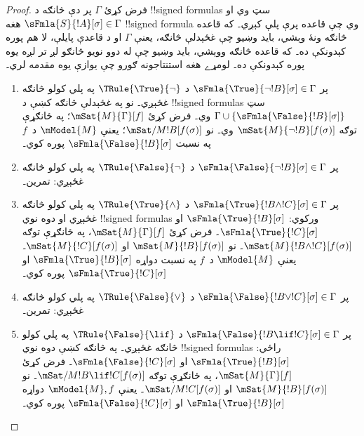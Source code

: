 \documentclass[../../../include/open-logic-section]{subfiles}
\begin{document}
\begin{proof}
فرض کړئ $\Gamma$ پر دې څانګه د !!{signed formula}s سټ وي او
$\sFmla{S}{!A}[\sigma] \in \Gamma$ هغه !!{signed formula}
وي چې قاعده پرې پلې کېږي۔ که قاعده څانګه ونۀ وېشي، بايد وښيو
چې غځېدلې څانګه، يعنې $\Gamma$ او د قاعدې پايلې، لا
هم پوره کېدونکې ده۔ که قاعده څانګه ووېشي، بايد وښيو چې له
دوو نويو څانګو لږ تر لږه يوه پوره کېدونکې ده۔
لومړے هغه استنتاجونه ګورو چې يوازې يوه مقدمه لري۔
\begin{enumerate}
\item پر $\sFmla{\True}{\lnot !B}[\sigma] \in \Gamma$ د
  $\TRule{\True}{\lnot}$ په پلي کولو څانګه غځېږي۔ نو په
  غځېدلې څانګه کښې د !!{signed formula}s سټ $\Gamma \cup
  \{\sFmla{\False}{!B}[\sigma]\}$ وي۔ فرض کړئ
  $\mSat{M}{\Gamma}[f]$؛ په ځانګړې توګه
  $\mSat{M}{\lnot !B}[f(\sigma)]$ وي۔ نو
  $\mSat/{M}{!B}[f(\sigma)]$؛ يعنې $\mModel{M}$ د~$f$ په
  نسبت $\sFmla{\False}{!B}[\sigma]$ پوره کوي۔
\item پر $\sFmla{\False}{\lnot !B}[\sigma] \in \Gamma$ د
  $\TRule{\False}{\lnot}$ په پلي کولو څانګه غځېږي: تمرين۔
\item پر $\sFmla{\True}{!B \land !C}[\sigma] \in \Gamma$ د
  $\TRule{\True}{\land}$ په پلي کولو څانګه غځېږي او دوه نوي
  !!{signed formula}s ورکوي:
  $\sFmla{\True}{!B}[\sigma]$ او $\sFmla{\True}{!C}[\sigma]$۔
  فرض کړئ $\mSat{M}{\Gamma}[f]$، په ځانګړې توګه
  $\mSat{M}{!B \land !C}[f(\sigma)]$۔ نو
  $\mSat{M}{!B}[f(\sigma)]$ او $\mSat{M}{!C}[f(\sigma)]$۔
  يعنې $\mModel{M}$ د~$f$ په نسبت دواړه
  $\sFmla{\True}{!B}[\sigma]$ او
  $\sFmla{\True}{!C}[\sigma]$ پوره کوي۔
\item پر $\sFmla{\False}{!B \lor !C}[\sigma] \in \Gamma$ د
  $\TRule{\False}{\lor}$ په پلي کولو څانګه غځېږي: تمرين۔
\item پر $\sFmla{\False}{!B \lif !C}[\sigma] \in \Gamma$ د
  $\TRule{\False}{\lif}$ په پلي کولو څانګه غځېږي۔ په څانګه
  کښې دوه نوي !!{signed formula}s راځي:
  $\sFmla{\True}{!B}[\sigma]$ او
  $\sFmla{\False}{!C}[\sigma]$۔ فرض کړئ
  $\mSat{M}{\Gamma}[f]$، په ځانګړې توګه
  $\mSat/{M}{!B \lif !C}[f(\sigma)]$۔ نو
  $\mSat{M}{!B}[f(\sigma)]$ او
  $\mSat/{M}{!C}[f(\sigma)]$۔ يعنې $\mModel{M}, f$ دواړه
  $\sFmla{\True}{!B}[\sigma]$ او
  $\sFmla{\False}{!C}[\sigma]$ پوره کوي۔

\end{enumerate}
\end{proof}
\end{document}
